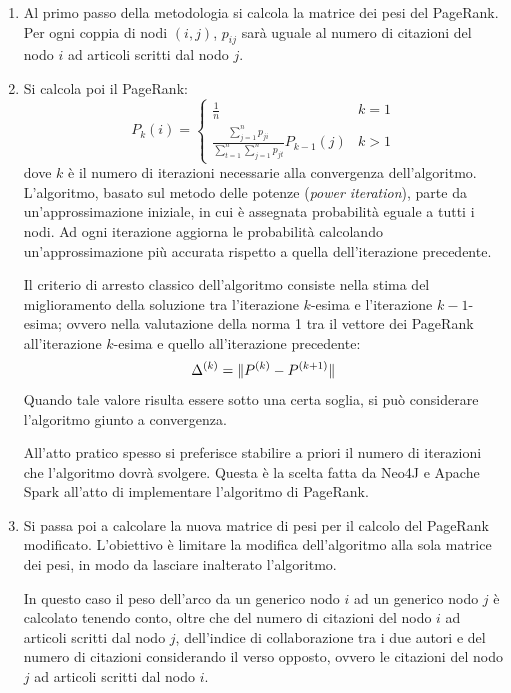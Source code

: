\documentclass[a4paper,12pt]{article}
\begin{document}
\begin{enumerate}
  \item 
  Al primo passo della metodologia si calcola la matrice dei pesi del PageRank. \\
  Per ogni coppia di nodi $ (i, j) $, $ p_{ij} $ sarà uguale al numero di citazioni del nodo $ i $ ad articoli scritti dal nodo $ j $. 
  \item
  Si calcola poi il PageRank: 
  \[
  P_k(i) = 
    \begin{cases} 
      \displaystyle \frac{1}{n} & k = 1 \\
      \displaystyle \frac
        {\displaystyle \sum_{j=1}^{n} p_{ji}}
        {\displaystyle \sum_{t=1}^{n} {\sum_{j=1}^{n} p_{jt}}}
        P_{k-1}(j) & k > 1 

    \end{cases} 
  \]
  dove $ k $ è il numero di iterazioni necessarie alla convergenza dell'algoritmo. L'algoritmo, basato sul metodo delle potenze (\textit{power iteration}), parte da un'approssimazione iniziale, in cui è assegnata probabilità eguale a tutti i nodi. Ad ogni iterazione aggiorna le probabilità calcolando un'approssimazione più accurata rispetto a quella dell'iterazione precedente.
  \par
  Il criterio di arresto classico dell'algoritmo consiste nella stima del miglioramento della soluzione tra l'iterazione $k$-esima e l'iterazione $k-1$-esima; ovvero nella valutazione della norma 1 tra il vettore dei PageRank all'iterazione $k$-esima e quello all'iterazione precedente:
  \[
    \Delta^{(k)} = \Arrowvert P^{(k)} - P^{(k+1)}\Arrowvert
  \]
  Quando tale valore risulta essere sotto una certa soglia, si può considerare l'algoritmo giunto a convergenza.
  \par
  All'atto pratico spesso si preferisce stabilire a priori il numero di iterazioni che l'algoritmo dovrà svolgere. Questa è la scelta fatta da Neo4J e Apache Spark all'atto di implementare l'algoritmo di PageRank.
  \item
  Si passa poi a calcolare la nuova matrice di pesi per il calcolo del PageRank modificato. L'obiettivo è limitare la modifica dell'algoritmo alla sola matrice dei pesi, in modo da lasciare inalterato l'algoritmo.
  \par
  In questo caso il peso dell'arco da un generico nodo $i$ ad un generico nodo $j$ è calcolato tenendo conto, oltre che del numero di citazioni del nodo $i$ ad articoli scritti dal nodo $j$, dell'indice di collaborazione tra i due autori e del numero di citazioni considerando il verso opposto, ovvero le citazioni del nodo $j$ ad articoli scritti dal nodo $i$. \\

\end{enumerate}
\end{document}

